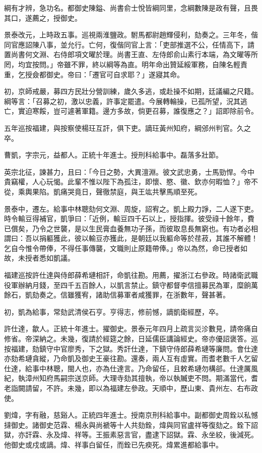 \begin{pinyinscope}
綱有才辨，急功名。都御史陳鎰、尚書俞士悅皆綱同里，念綱數陳是政有聲，且畏其口，遂薦之，授御史。

景泰改元，上時政五事。巡視兩淮鹽政。駙馬都尉趙輝侵利，劾奏之。三年冬，偕同官應詔陳八事，並允行。亡何，復偕同官上言：「吏部推選不公，任情高下，請置尚書何文淵、右侍郎項文曜於理。尚書王直、左侍郎俞山素行本端，為文曜等所罔，均宜按問。」帝雖不罪，終以綱等為直。明年命出贊延綏軍務，自陳名輕責重，乞授僉都御史。帝曰：「遷官可自求耶？」遂寢其命。

初，京師戒嚴，募四方民壯分營訓練，歲久多逃，或赴操不如期，廷議編之尺籍。綱等言：「召募之初，激以忠義，許事定罷遣。今展轉輪操，已孤所望，況其逃亡，實迫寒餒，豈可遽著軍籍。邊方多故，倘更召募，誰復應之？」詔即除前令。

五年巡按福建，與按察使楊玨互訐，俱下吏。謫玨黃州知府，綱邠州判官。久之卒。

曹凱，字宗元，益都人。正統十年進士。授刑科給事中。磊落多壯節。

英宗北征，諫甚力，且曰：「今日之勢，大異澶淵。彼文武忠勇，士馬勁悍。今中貴竊權，人心玩愒。此輩不惟以陛下為孤注，即懷、愍、徽、欽亦何暇恤？」帝不從，乘輿果陷。凱痛哭竟日，聲徹禁庭，與王竑共擊馬順至死。

景泰中，遷左。給事中林聰劾何文淵、周旋，詔宥之。凱上殿力諍，二人遂下吏。時令輸豆得補官，凱爭曰：「近例，輸豆四千石以上，授指揮。彼受祿十餘年，費已償矣，乃令之世襲，是以生民膏血養無功子孫，而彼取息長無窮也。有功者必相謂曰：吾以捐軀獲此，彼以輸豆亦獲此，是朝廷以我軀命等於荏菽，其誰不解體！乞自今惟令帶俸，不得任事傳襲，文職則止原籍帶俸。」帝以為然，命已授者如故，未授者悉如凱議。

福建巡按許仕達與侍郎薛希璉相訐，命凱往勘。用薦，擢浙江右參政。時諸衛武職役軍辦納月錢，至四千五百餘人，以凱言禁止。鎮守都督李信擅募民為軍，糜餉萬餘石，凱劾奏之。信雖獲宥，諸助信募軍者咸獲罪，在浙數年，聲甚著。

初，凱為給事，常劾武清侯石亨。亨得志，修前憾，謫凱衛經歷，卒。

許仕達，歙人。正統十年進士。擢御史。景泰元年四月上疏言災沴數見，請帝痛自修省。帝深納之。未幾，復請於經筵之餘，日延儒臣講論經史。帝亦優詔褒答。巡按福建，劾鎮守中官廖秀，下之獄。秀訐仕達，下鎮守侍郎薛希璉等廉問。會仕達亦劾希璉貪縱，乃命凱及御史王豪往勘。還奏，兩人互有虛實。而耆老數千人乞留仕達，給事中林聰，閩人也，亦為仕達言。乃命留任，且敕希璉勿構郤。仕達厲風紀，執漳州知府馬嗣宗送京師。大理寺劾其擅執，帝以執贓吏不問。期滿當代，耆老詣闕請留，不許。未幾，即以為福建左參政。天順中，歷山東、貴州左、右布政使。

劉煒，字有融，慈谿人。正統四年進士。授南京刑科給事中。副都御史周銓以私憾撻御史。諸御史范霖、楊永與尚褫等十人共劾銓，煒與同官盧祥等復劾之。銓下詔獄，亦訐霖、永及煒、祥等。王振素惡言官，盡逮下詔獄。霖、永坐絞，後減死。他御史或戍或謫。煒、祥事白留任，而銓已先瘐死。煒累進都給事中。


\end{pinyinscope}

